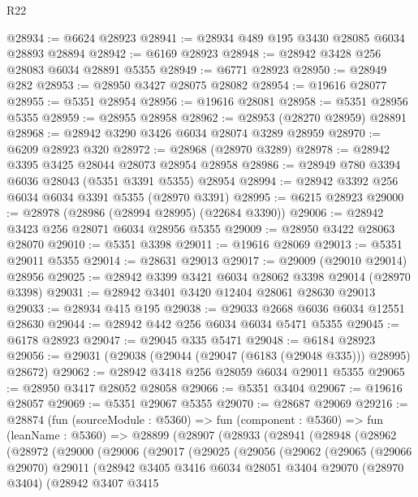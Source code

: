 \begin{lexlean}{R22}
\begin{coremodule}
@28934 := @6624 @28923
@28941 := @28934 @489 @195 @3430 @28085 @6034 @28893 @28894
@28942 := @6169 @28923
@28948 := @28942 @3428 @256 @28083 @6034 @28891 @5355
@28949 := @6771 @28923
@28950 := @28949 @282
@28953 := @28950 @3427 @28075 @28082
@28954 := @19616 @28077
@28955 := @5351 @28954
@28956 := @19616 @28081
@28958 := @5351 @28956 @5355
@28959 := @28955 @28958
@28962 := @28953 (@28270 @28959) @28891
@28968 := @28942 @3290 @3426 @6034 @28074 @3289 @28959
@28970 := @6209 @28923 @320
@28972 := @28968 (@28970 @3289)
@28978 := @28942 @3395 @3425 @28044 @28073 @28954 @28958
@28986 := @28949 @780 @3394 @6036 @28043 (@5351 @3391 @5355) @28954
@28994 := @28942 @3392 @256 @6034 @6034 @3391 @5355 (@28970 @3391)
@28995 := @6215 @28923
@29000 := @28978 (@28986 (@28994 @28995) (@22684 @3390))
@29006 := @28942 @3423 @256 @28071 @6034 @28956 @5355
@29009 := @28950 @3422 @28063 @28070
@29010 := @5351 @3398
@29011 := @19616 @28069
@29013 := @5351 @29011 @5355
@29014 := @28631 @29013
@29017 := @29009 (@29010 @29014) @28956
@29025 := @28942 @3399 @3421 @6034 @28062 @3398 @29014 (@28970 @3398)
@29031 := @28942 @3401 @3420 @12404 @28061 @28630 @29013
@29033 := @28934 @415 @195
@29038 := @29033 @2668 @6036 @6034 @12551 @28630
@29044 := @28942 @442 @256 @6034 @6034 @5471 @5355
@29045 := @6178 @28923
@29047 := @29045 @335 @5471
@29048 := @6184 @28923
@29056 := @29031 (@29038 (@29044 (@29047 (@6183 (@29048 @335))) @28995) @28672)
@29062 := @28942 @3418 @256 @28059 @6034 @29011 @5355
@29065 := @28950 @3417 @28052 @28058
@29066 := @5351 @3404
@29067 := @19616 @28057
@29069 := @5351 @29067 @5355
@29070 := @28687 @29069
@29216 := @28874
    (fun (sourceModule : @5360) =>
    fun (component : @5360) =>
    fun (leanName : @5360) =>
    @28899
      (@28907
        (@28933
          (@28941
            (@28948
              (@28962
                (@28972
                  (@29000
                    (@29006
                      (@29017
                        (@29025
                          (@29056
                            (@29062
                              (@29065
                                (@29066 @29070)
                                @29011
                                (@28942
                                  @3405
                                  @3416
                                  @6034
                                  @28051
                                  @3404
                                  @29070
                                  (@28970 @3404)
                                  (@28942
                                    @3407
                                    @3415

\end{coremodule}
\end{lexlean}
